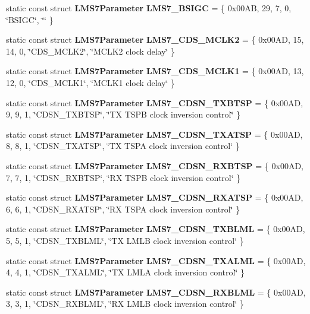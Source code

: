 \begin{DoxyCompactItemize}
\item 
static const struct {\bf L\+M\+S7\+Parameter} {\bf L\+M\+S7\+\_\+\+B\+S\+I\+GC} = \{ 0x00\+A\+B, 29, 7, 0, \char`\"{}\+B\+S\+I\+G\+C\char`\"{}, \char`\"{}\char`\"{} \}
\item 
static const struct {\bf L\+M\+S7\+Parameter} {\bf L\+M\+S7\+\_\+\+C\+D\+S\+\_\+\+M\+C\+L\+K2} = \{ 0x00\+A\+D, 15, 14, 0, \char`\"{}\+C\+D\+S\+\_\+\+M\+C\+L\+K2\char`\"{}, \char`\"{}\+M\+C\+L\+K2 clock delay\char`\"{} \}
\item 
static const struct {\bf L\+M\+S7\+Parameter} {\bf L\+M\+S7\+\_\+\+C\+D\+S\+\_\+\+M\+C\+L\+K1} = \{ 0x00\+A\+D, 13, 12, 0, \char`\"{}\+C\+D\+S\+\_\+\+M\+C\+L\+K1\char`\"{}, \char`\"{}\+M\+C\+L\+K1 clock delay\char`\"{} \}
\item 
static const struct {\bf L\+M\+S7\+Parameter} {\bf L\+M\+S7\+\_\+\+C\+D\+S\+N\+\_\+\+T\+X\+B\+T\+SP} = \{ 0x00\+A\+D, 9, 9, 1, \char`\"{}\+C\+D\+S\+N\+\_\+\+T\+X\+B\+T\+S\+P\char`\"{}, \char`\"{}\+T\+X T\+S\+P\+B clock inversion control\char`\"{} \}
\item 
static const struct {\bf L\+M\+S7\+Parameter} {\bf L\+M\+S7\+\_\+\+C\+D\+S\+N\+\_\+\+T\+X\+A\+T\+SP} = \{ 0x00\+A\+D, 8, 8, 1, \char`\"{}\+C\+D\+S\+N\+\_\+\+T\+X\+A\+T\+S\+P\char`\"{}, \char`\"{}\+T\+X T\+S\+P\+A clock inversion control\char`\"{} \}
\item 
static const struct {\bf L\+M\+S7\+Parameter} {\bf L\+M\+S7\+\_\+\+C\+D\+S\+N\+\_\+\+R\+X\+B\+T\+SP} = \{ 0x00\+A\+D, 7, 7, 1, \char`\"{}\+C\+D\+S\+N\+\_\+\+R\+X\+B\+T\+S\+P\char`\"{}, \char`\"{}\+R\+X T\+S\+P\+B clock inversion control\char`\"{} \}
\item 
static const struct {\bf L\+M\+S7\+Parameter} {\bf L\+M\+S7\+\_\+\+C\+D\+S\+N\+\_\+\+R\+X\+A\+T\+SP} = \{ 0x00\+A\+D, 6, 6, 1, \char`\"{}\+C\+D\+S\+N\+\_\+\+R\+X\+A\+T\+S\+P\char`\"{}, \char`\"{}\+R\+X T\+S\+P\+A clock inversion control\char`\"{} \}
\item 
static const struct {\bf L\+M\+S7\+Parameter} {\bf L\+M\+S7\+\_\+\+C\+D\+S\+N\+\_\+\+T\+X\+B\+L\+ML} = \{ 0x00\+A\+D, 5, 5, 1, \char`\"{}\+C\+D\+S\+N\+\_\+\+T\+X\+B\+L\+M\+L\char`\"{}, \char`\"{}\+T\+X L\+M\+L\+B clock inversion control\char`\"{} \}
\item 
static const struct {\bf L\+M\+S7\+Parameter} {\bf L\+M\+S7\+\_\+\+C\+D\+S\+N\+\_\+\+T\+X\+A\+L\+ML} = \{ 0x00\+A\+D, 4, 4, 1, \char`\"{}\+C\+D\+S\+N\+\_\+\+T\+X\+A\+L\+M\+L\char`\"{}, \char`\"{}\+T\+X L\+M\+L\+A clock inversion control\char`\"{} \}
\item 
static const struct {\bf L\+M\+S7\+Parameter} {\bf L\+M\+S7\+\_\+\+C\+D\+S\+N\+\_\+\+R\+X\+B\+L\+ML} = \{ 0x00\+A\+D, 3, 3, 1, \char`\"{}\+C\+D\+S\+N\+\_\+\+R\+X\+B\+L\+M\+L\char`\"{}, \char`\"{}\+R\+X L\+M\+L\+B clock inversion control\char`\"{} \}

\end{DoxyCompactItemize}
